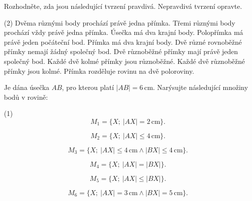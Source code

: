 \documentclass[12pt,a4paper]{article}
\begin{document}
\begin{exercise}

    Rozhodněte, zda jsou následující tvrzení pravdivá. Nepravdivá tvrzení opravte.

    \begin{tasks}(2)
        \task Dvěma různými body prochází právě jedna přímka.
        \task Třemi různými body prochází vždy právě jedna přímka.
        \task Úsečka má dva krajní body.
        \task Polopřímka má právě jeden počáteční bod.
        \task Přímka má dva krajní body.
        \task Dvě různé rovnoběžné přímky nemají žádný společný bod.
        \task Dvě různoběžné přímky mají právě jeden společný bod.
        \task Každé dvě kolmé přímky jsou různoběžné.
        \task Každé dvě různoběžné přímky jsou kolmé.
        \task Přímka rozděluje rovinu na dvě poloroviny.
    \end{tasks}

\end{exercise}



\begin{exercise}

    Je dána úsečka $AB$, pro kterou platí $|AB|=6\,\mathrm{cm}$.
    Narýsujte následující množiny bodů v rovině:

    \begin{tasks}(1)
        \task
        \[
            M_1=\{X;\ |AX|=2\,\mathrm{cm}\}.
        \]

        \task
        \[
            M_2=\{X;\ |AX|\leq 4\,\mathrm{cm}\}.
        \]

        \task
        \[
            M_3=\{X;\ |AX|\leq 4\,\mathrm{cm}
            \land |BX|\leq 4\,\mathrm{cm}\}.
        \]

        \task
        \[
            M_4=\{X;\ |AX|=|BX|\}.
        \]

        \task
        \[
            M_5=\{X;\ |AX|\leq |BX|\}.
        \]

        \task
        \[
            M_6=\{X;\ |AX|=3\,\mathrm{cm}
            \land |BX|=5\,\mathrm{cm}\}.
        \]
    \end{tasks}

\end{exercise}


\end{document}
